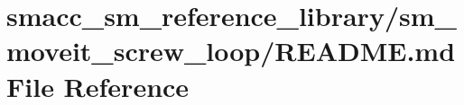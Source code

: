 \hypertarget{smacc__sm__reference__library_2sm__moveit__screw__loop_2README_8md}{}\section{smacc\+\_\+sm\+\_\+reference\+\_\+library/sm\+\_\+moveit\+\_\+screw\+\_\+loop/\+R\+E\+A\+D\+ME.md File Reference}
\label{smacc__sm__reference__library_2sm__moveit__screw__loop_2README_8md}
